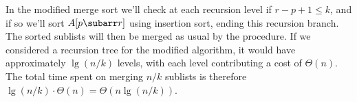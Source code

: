 In the modified merge sort we'll check at each recursion level if $r-p+1\le k$, and if so we'll sort $A[p\subarr r]$ using insertion sort, ending this recursion branch.
The sorted sublists will then be merged as usual by the  procedure.
If we considered a recursion tree for the modified algorithm, it would have approximately $\lg(n/k)$ levels, with each level contributing a cost of $\Theta(n)$.
The total time spent on merging $n/k$ sublists is therefore $\lg(n/k)\cdot\Theta(n)=\Theta(n\lg(n/k))$.
